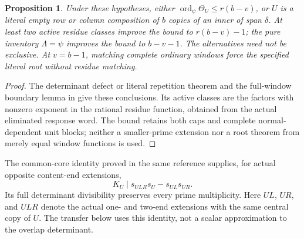 \documentclass[11pt,a4paper]{amsart}
\numberwithin{equation}{section}
\theoremstyle{plain}
\newtheorem{proposition}[theorem]{Proposition}
\theoremstyle{definition}
\begin{document}
\begin{proposition}\label{prop:determinant-import}
Under these hypotheses, either \(\operatorname{ord}_\psi\Theta_U\le r(b-v)\), or \(U\) is a literal empty row or column composition of \(b\) copies of an inner of span \(\delta\).  At least two active residue classes improve the bound to \(r(b-v)-1\); the pure inventory \(\Lambda=\psi\) improves the bound to \(b-v-1\).  The alternatives need not be exclusive.  At \(v=b-1\), matching complete ordinary windows force the specified literal root without residue matching.
\end{proposition}
\begin{proof}
The determinant defect or literal repetition theorem and the full-window boundary lemma in \cite{Shields2026CornerDescent} give these conclusions.  Its active classes are the factors with nonzero exponent in the rational residue function, obtained from the actual eliminated response word.  The bound retains both caps and complete normal-dependent unit blocks; neither a smaller-prime extension nor a root theorem from merely equal window functions is used.
\end{proof}

The common-core identity proved in the same reference supplies, for actual opposite content-end extensions,
\begin{equation}\label{eq:shared-core-import}
 K_U\mid s_{ULR}s_U-s_{UL}s_{UR}.
\end{equation}
Its full determinant divisibility preserves every prime multiplicity.  Here \(UL\), \(UR\), and \(ULR\) denote the actual one- and two-end extensions with the same central copy of \(U\).  The transfer below uses this identity, not a scalar approximation to the overlap determinant.
\end{document}

